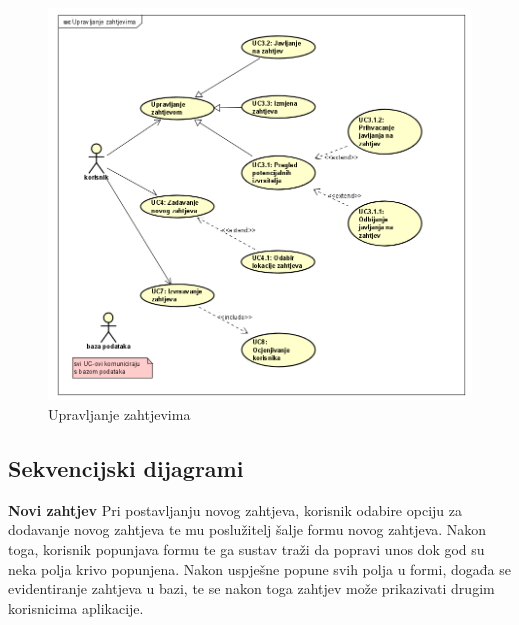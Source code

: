 					\begin{figure}[H]
					\includegraphics[scale=0.7]{slike/upravljanje-zahtjevima.png} %
					\centering
					\caption{Upravljanje zahtjevima}
				\end{figure}
				\newpage
				
				
				\eject		
				
			\subsection{Sekvencijski dijagrami}
				
				\noindent \large {\textbf{Novi zahtjev}}
				\newline
				\noindent \normalsize Pri postavljanju novog zahtjeva, korisnik odabire opciju za dodavanje novog zahtjeva te mu poslužitelj šalje formu novog zahtjeva. Nakon toga, korisnik popunjava formu te ga sustav traži da popravi unos dok god su neka polja krivo popunjena. Nakon uspješne popune svih polja u formi, događa se evidentiranje zahtjeva u bazi, te se nakon toga zahtjev može prikazivati drugim korisnicima aplikacije. 
				   
